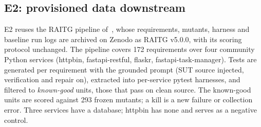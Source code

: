 \documentclass[preprint,12pt]{elsarticle}
\begin{document}
\subsection{E2: provisioned data downstream}
\label{sec:e2design}
E2 reuses the RAITG pipeline of~\cite{javvadi2026raitg}, whose requirements, mutants, harness and baseline run logs are archived on Zenodo as RAITG v5.0.0, with its scoring protocol unchanged. The pipeline covers 172 requirements over four community Python services (httpbin, fastapi-restful, flaskr, fastapi-task-manager). Tests are generated per requirement with the grounded prompt (SUT source injected, verification and repair on), extracted into per-service pytest harnesses, and filtered to \emph{known-good} units, those that pass on clean source. The known-good units are scored against 293 frozen mutants; a kill is a new failure or collection error. Three services have a database; httpbin has none and serves as a negative control.
\end{document}
